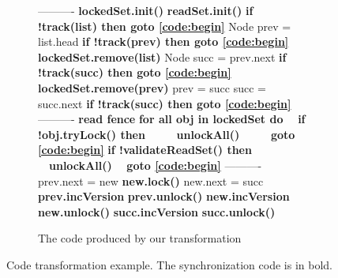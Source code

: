 \begin{figure*}
\begin{center}
\begin{subfigure}[b]{.53\textwidth}
\begin{algorithmic}[1]{}
{			\Statex ----------
            \State{\spOne}\textbf{lockedSet.init()} \label{code:initSets1}
            \State{\spOne}\textbf{readSet.init()} \label{code:initSets2}
            \State{\spOne}\textbf{if !track(list)  then {goto} \ref{code:begin}} \label{code:readGhaseGoto0}
			\State{\spOne}Node prev = list.head
			\State{\spOne}\textbf{if !track(prev)  then {goto} \ref{code:begin}} \label{code:readGhaseGoto1}
            \State{\spOne}\textbf{lockedSet.remove(list)} \label{code:lockedSet:remove1}
			\State{\spOne}Node succ = prev.next
			\State{\spOne}\textbf{if !track(succ) then {goto} \ref{code:begin}}  \label{code:readGhaseGoto2}
			\State{\spZero}\textbf{lockedSet.remove(prev)} \label{code:lockedSet:remove2}
			\State{\spZero}prev = succ
			\State{\spZero}succ = succ.next
			\State{\spZero}\textbf{if !track(succ) then {goto} \ref{code:begin}} \label{code:readGhaseGoto3}
			\Statex ----------
			\State{\spZero}\textbf{read fence} \label{code:fence}
			\State{\spZero}\textbf{for all obj in lockedSet do} \label{code:validateLockedSet}	
            \State{\spZero}\ \ \textbf{if !obj.tryLock() then}
            \State{\spZero}\ \ \ \ \ \textbf{unlockAll()}
            \State{\spZero}\ \ \ \ \ \textbf{{goto} \ref{code:begin}} \label{code:validateGoto1}
			\State{\spZero}\textbf{if !validateReadSet() then} 		\label{code:validateReadSet}
				\State{\spZero}\ \ \textbf{unlockAll()}
				\State{\spZero}\ \ \textbf{{goto} \ref{code:begin}} \label{code:validateGoto2}
			\Statex ----------
			\State{\spZero}prev.next = new
			\State{\spZero}\textbf{new.lock()}
			\State{\spZero}new.next = succ			
			\State{\spZero}\textbf{prev.incVersion}
			\State{\spZero}\textbf{prev.unlock()}
			\State{\spZero}\textbf{new.incVersion}
			\State{\spZero}\textbf{new.unlock()}
			\State{\spZero}\textbf{succ.incVersion}
			\State{\spZero}\textbf{succ.unlock()}

			\EndFunction
			}
		\end{algorithmic}
		\caption{The code produced by our  transformation}\label{figure:transformation:after}
	\end{subfigure}
	\end{center}
\vspace{-4mm}
	\caption{Code transformation example.
	The synchronization code is in bold.
			\label{figure:transformation}}
\end{figure*}

